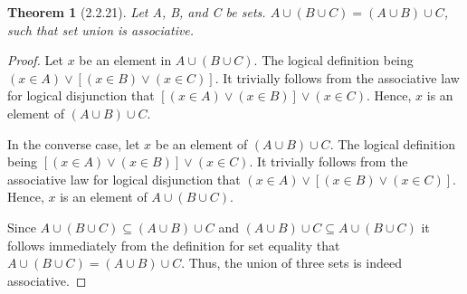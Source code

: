 \documentclass[a4paper, 12pt]{article}
\theoremstyle{plain}
\newtheorem*{theorem*}{Theorem}
\begin{document}
	
	\begin{theorem*}[2.2.21]
		Let A, B, and C be sets. $A \cup (B \cup C) = (A \cup B) \cup C$, such that set union is 
		associative.
	\end{theorem*}
	
	\begin{proof}
		Let $x$ be an element in $A \cup (B \cup C)$. The logical definition being \newline 
		$(x \in A) \lor [(x \in B) \lor (x \in C)]$. It trivially follows from the associative 
		law for logical disjunction that $[(x \in A) \lor (x \in B)] \lor (x \in C)$. Hence, $x$ 
		is an element of $(A \cup B) \cup C$.
		
		In the converse case, let $x$ be an element of $(A \cup B) \cup C$. The logical definition 
		being $[(x \in A) \lor (x \in B)] \lor (x \in C)$. It trivially follows from the associative 
		law for logical disjunction that $(x \in A) \lor [(x \in B) \lor (x \in C)]$. Hence, $x$ is 
		an element of $A \cup (B \cup C) $.
		
		Since $A \cup (B \cup C) \subseteq (A \cup B) \cup C$ and 
		$(A \cup B) \cup C \subseteq A \cup (B \cup C)$ it follows immediately from the definition 
		for set equality that \newline $A \cup (B \cup C) = (A \cup B) \cup C$. Thus, the union of 
		three sets is indeed associative.
	\end{proof}
\end{document}
